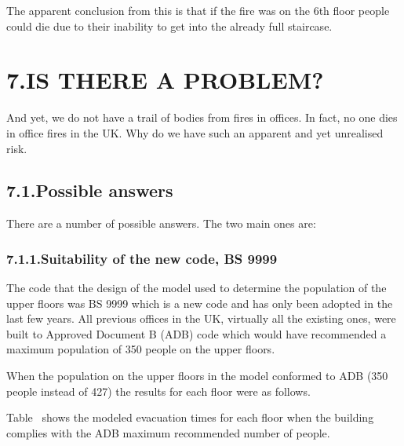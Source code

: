\documentclass{style/llncs}
\begin{document}
The apparent conclusion from this is that if the fire was on the 6th floor people could die due to their inability to get into the already full staircase.%

\section{7.\hspace*{0.5em}IS THERE A PROBLEM?}\label{sec-is-there-a-problem}%

\noindent{}And yet, we do not have a trail of bodies from fires in offices.  In fact, no one dies in office fires in the UK.  Why do we have such an apparent and yet unrealised risk.%

\subsection{7.1.\hspace*{0.5em}Possible answers}\label{sec-possible-answers}%

\noindent{}There are a number of possible answers.  The two main ones are:%

\subsubsection{7.1.1.\hspace*{0.5em}Suitability of the new code, BS 9999}\label{sec-suitability-of-the-new-code-bs-9999}%

\noindent{}The code that the design of the model used to determine the population of the upper floors was BS 9999 which is a new code and has only been adopted in the last few years.  All previous offices in the UK, virtually all the existing ones, were built to Approved Document B (ADB) code which would have recommended a maximum population of 350 people on the upper floors.%

When the population on the upper floors in the model conformed to ADB (350 people instead of 427) the results for each floor were as follows.%

Table~ shows the modeled evacuation times for each floor when the building complies with the ADB maximum recommended number of people.%
\end{document}
